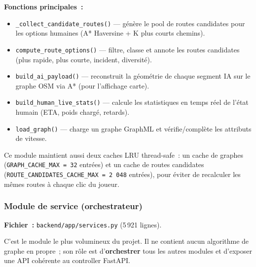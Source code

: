 \documentclass[a4paper, 12pt, twoside]{article}
\begin{document}
\textbf{Fonctions principales~:}
\begin{itemize}
  \item \texttt{\_collect\_candidate\_routes()} --- g\'{e}n\`{e}re le pool de routes candidates pour les options humaines (A* Haversine + K plus courts chemins).
  \item \texttt{compute\_route\_options()} --- filtre, classe et annote les routes candidates (plus rapide, plus courte, incident, diversit\'{e}).
  \item \texttt{build\_ai\_payload()} --- reconstruit la g\'{e}om\'{e}trie de chaque segment IA sur le graphe OSM via A* (pour l'affichage carte).
  \item \texttt{build\_human\_live\_stats()} --- calcule les statistiques en temps r\'{e}el de l'\'{e}tat humain (ETA, poids charg\'{e}, retards).
  \item \texttt{load\_graph()} --- charge un graphe GraphML et v\'{e}rifie/compl\`{e}te les attributs de vitesse.
\end{itemize}

Ce module maintient aussi deux caches LRU thread-safe~: un cache de graphes
(\texttt{GRAPH\_CACHE\_MAX = 32} entr\'{e}es) et un cache de routes candidates
(\texttt{ROUTE\_CANDIDATES\_CACHE\_MAX = 2\,048} entr\'{e}es), pour \'{e}viter de
recalculer les m\^{e}mes routes \`{a} chaque clic du joueur.

\subsubsection{Module de service (orchestrateur)}

\textbf{Fichier~:} \texttt{backend/app/services.py} (5\,921 lignes).

C'est le module le plus volumineux du projet. Il ne contient aucun algorithme de graphe
en propre~; son r\^{o}le est d'\textbf{orchestrer} tous les autres modules et d'exposer
une API coh\'{e}rente au controller FastAPI.
\end{document}
